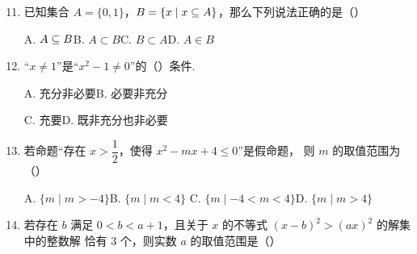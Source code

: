 \documentclass[a4paper,11pt]{article}
\begin{document}
\begin{enumerate}
\setcounter{enumi}{10}

\item 已知集合 $A=\{0,1\}$，$B=\{x\mid x\subseteq A\}$，那么下列说法正确的是\mbox{（\quad）}

\keepwithprev
A. $A\subseteq B$\qquad B. $A\subset B$\qquad C. $B\subset A$\qquad D. $A\in B$


\ifanswer
\solbegin
\solend

\fi

\item “$x\neq1$”是“$x^2-1\neq0$”的\mbox{（\quad）}条件.

\keepwithprev
A. 充分非必要\qquad B. 必要非充分

C. 充要\qquad D. 既非充分也非必要


\ifanswer
\solbegin
{}
\solend

\fi

\item 若命题“存在 $x>\dfrac12$，使得 $x^2-mx+4\leqslant0$”是假命题，
则 $m$ 的取值范围为\mbox{（\quad）}

\keepwithprev
A. $\{m\mid m>-4\}$\qquad B. $\{m\mid m<4\}$\qquad
C. $\{m\mid-4<m<4\}$\qquad D. $\{m\mid m>4\}$


\ifanswer
\solbegin
{}
\solend

\fi

\item 若存在 $b$ 满足 $0<b<a+1$，且关于 $x$ 的不等式 $(x-b)^2>(ax)^2$ 的解集中的整数解
恰有 $3$ 个，则实数 $a$ 的取值范围是\mbox{（\quad）}


\end{enumerate}
\end{document}
